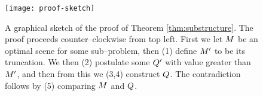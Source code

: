 \begin{figure}[tb]
  \centering
  \texttt{[image: proof-sketch]}
  \caption{A graphical sketch of the proof of Theorem
    \ref{thm:substructure}. The proof proceeds counter--clockwise from top
    left. First we let $\Scene$ be an optimal scene for some
    sub--problem, then (1) define $\TruncScene$ to be its
    truncation. We then (2) postulate some $\CfTruncScene$ with value
    greater than $\TruncScene$, and then from this we (3,4) construct
    $\CfScene$. The contradiction follows by (5) comparing $\Scene$
    and $\CfScene$.}
  \label{fig:proof-sketch}
\end{figure}




